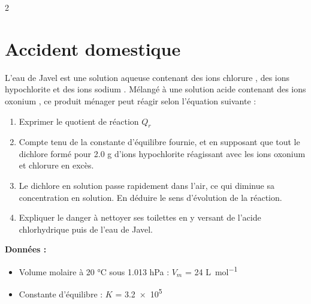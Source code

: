 \documentclass[a4paper,11pt,fleqn]{article}%
\begin{document}
\begin{multicols}{2}
\section{Accident domestique}
L'eau de Javel est une solution aqueuse contenant des ions chlorure , des ions hypochlorite  et des ions sodium . Mélangé à une solution acide contenant des ions oxonium , ce produit ménager peut réagir selon l'équation suivante :\\
\begin{enumerate}
	\item Exprimer le quotient de réaction $Q_r$
	\item Compte tenu de la constante d'équilibre fournie, et en supposant que tout le dichlore  formé pour \num{2,0} \unit{\gram} d'ions hypochlorite  réagissant avec les ions oxonium  et chlorure  en excès.
	\item Le dichlore  en solution passe rapidement dans l'air, ce qui diminue sa concentration en solution. En déduire le sens d'évolution de la réaction.
	\item Expliquer le danger à nettoyer ses toilettes en y versant de l'acide chlorhydrique puis de l'eau de Javel.
\end{enumerate}
\textbf{Données :}\\
\begin{itemize}
	\item Volume molaire à \num{20} \unit{\celsius} sous \num{1,013} \unit{\hecto \pascal} : $V_m$ = \num{24} \unit{\liter \per \mole}
	\item Constante d'équilibre : $K$ = \num{3,2e5}
\end{itemize}


\end{multicols}
\end{document}
